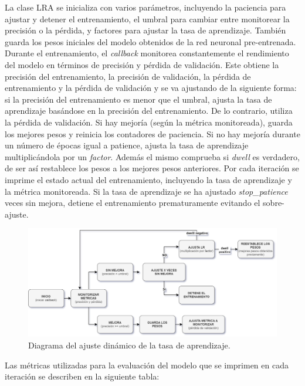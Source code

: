 La clase LRA se inicializa con varios parámetros, incluyendo la paciencia para ajustar y detener el entrenamiento, el umbral para cambiar entre monitorear la precisión o la pérdida, y factores para ajustar la tasa de aprendizaje. También guarda los pesos iniciales del modelo obtenidos de la red neuronal pre-entrenada. Durante el entrenamiento, el \textit{callback} monitorea constantemente el rendimiento del modelo en términos de precisión y pérdida de validación. Este obtiene la precisión del entrenamiento, la precisión de validación, la pérdida de entrenamiento y la pérdida de validación y se va ajustando de la siguiente forma: si la precisión del entrenamiento es menor que el umbral, ajusta la tasa de aprendizaje basándose en la precisión del entrenamiento. De lo contrario, utiliza la pérdida de validación. Si hay mejoría (según la métrica monitoreada), guarda los mejores pesos y reinicia los contadores de paciencia. Si no hay mejoría durante un número de épocas igual a patience, ajusta la tasa de aprendizaje multiplicándola por un \textit{factor}. Además el mismo comprueba si \textit{dwell} es verdadero, de ser así restablece los pesos a los mejores pesos anteriores. Por cada iteración se imprime el estado actual del entrenamiento, incluyendo la tasa de aprendizaje y la métrica monitoreada. Si la tasa de aprendizaje se ha ajustado \textit{stop\_patience} veces sin mejora, detiene el entrenamiento prematuramente evitando el sobre-ajuste.

\begin{figure}[H]
   \begin{center}
   \includegraphics[width=1\textwidth]{./Graphics/diagrama_lra.drawio.png}
   \caption{Diagrama del ajuste dinámico de la tasa de aprendizaje.}
   \label{fig:lra_permormance}
   \end{center}
   \end{figure}

Las métricas utilizadas para la evaluación del modelo que se imprimen en cada iteración se describen en la siguiente tabla:

